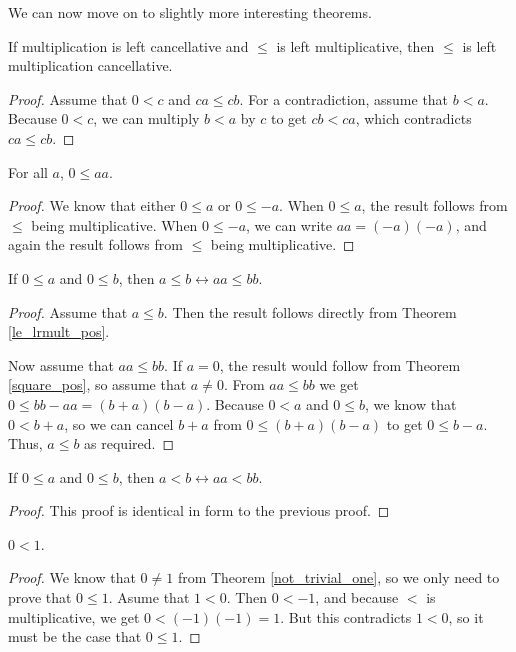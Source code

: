 \documentclass[../../math.tex]{subfiles}
\begin{document}
We can now move on to slightly more interesting theorems.

\begin{instance}
    If multiplication is left cancellative and $\leq$ is left multiplicative,
    then $\leq$ is left multiplication cancellative.
\end{instance}
\begin{proof}
    Assume that $0 < c$ and $ca \leq cb$.  For a contradiction, assume that $b <
    a$.  Because $0 < c$, we can multiply $b < a$ by $c$ to get $cb < ca$, which
    contradicts $ca \leq cb$.
\end{proof}

\begin{theorem} \label{square_pos}
    For all $a$, $0 \leq aa$.
\end{theorem}
\begin{proof}
    We know that either $0 \leq a$ or $0 \leq -a$.  When $0 \leq a$, the result
    follows from $\leq$ being multiplicative.  When $0 \leq -a$, we can write
    $aa = (-a)(-a)$, and again the result follows from $\leq$ being
    multiplicative.
\end{proof}

\begin{theorem}
    If $0 \leq a$ and $0 \leq b$, then $a \leq b \leftrightarrow aa \leq bb$.
\end{theorem}
\begin{proof}
    Assume that $a \leq b$.  Then the result follows directly from Theorem
    \ref{le_lrmult_pos}.

    Now assume that $aa \leq bb$.  If $a = 0$, the result would follow from
    Theorem \ref{square_pos}, so assume that $a \neq 0$.  From $aa \leq bb$ we
    get $0 \leq bb - aa = (b + a)(b - a)$.  Because $0 < a$ and $0 \leq b$, we
    know that $0 < b + a$, so we can cancel $b + a$ from $0 \leq (b + a)(b - a)$
    to get $0 \leq b - a$.  Thus, $a \leq b$ as required.
\end{proof}

\begin{theorem}
    If $0 \leq a$ and $0 \leq b$, then $a < b \leftrightarrow aa < bb$.
\end{theorem}
\begin{proof}
    This proof is identical in form to the previous proof.
\end{proof}

\begin{theorem} \label{one_pos}
    $0 < 1$.
\end{theorem}
\begin{proof}
    We know that $0 \neq 1$ from Theorem \ref{not_trivial_one}, so we only need
    to prove that $0 \leq 1$.  Asume that $1 < 0$.  Then $0 < -1$, and because
    $<$ is multiplicative, we get $0 < (-1)(-1) = 1$.  But this contradicts $1 <
    0$, so it must be the case that $0 \leq 1$.
\end{proof}
\end{document}
